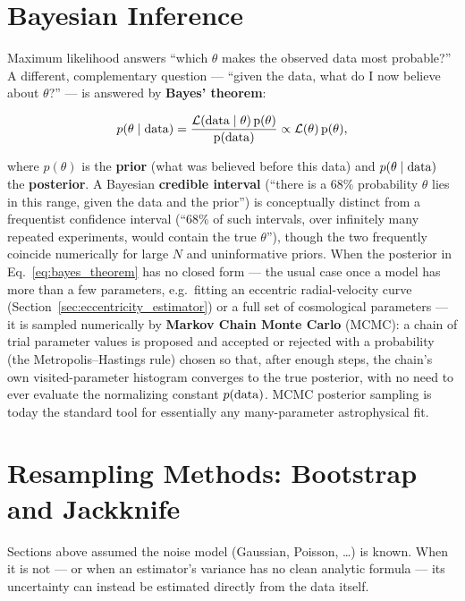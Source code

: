 \section{Bayesian Inference}

Maximum likelihood answers ``which $\theta$ makes the observed data most probable?'' A different, complementary question --- ``given the data, what do I now believe about $\theta$?'' --- is answered by \textbf{Bayes' theorem}:
\begin{keyresult}
	\begin{equation}
		p(\theta\mid \rm{data}) = \frac{\mathcal L(\rm{data}\mid\theta)\,p(\theta)}{p(\rm{data})} \propto \mathcal L(\theta)\,p(\theta),
		\label{eq:bayes_theorem}
	\end{equation}
\end{keyresult}
where $p(\theta)$ is the \textbf{prior} (what was believed before this data) and $p(\theta\mid\rm{data})$ the \textbf{posterior}. A Bayesian \textbf{credible interval} (``there is a 68\% probability $\theta$ lies in this range, given the data and the prior'') is conceptually distinct from a frequentist confidence interval (``68\% of such intervals, over infinitely many repeated experiments, would contain the true $\theta$''), though the two frequently coincide numerically for large $N$ and uninformative priors. When the posterior in Eq.~\eqref{eq:bayes_theorem} has no closed form --- the usual case once a model has more than a few parameters, e.g.\ fitting an eccentric radial-velocity curve (Section~\ref{sec:eccentricity_estimator}) or a full set of cosmological parameters --- it is sampled numerically by \textbf{Markov Chain Monte Carlo} (MCMC): a chain of trial parameter values is proposed and accepted or rejected with a probability (the Metropolis--Hastings rule) chosen so that, after enough steps, the chain's own visited-parameter histogram converges to the true posterior, with no need to ever evaluate the normalizing constant $p(\rm{data})$. MCMC posterior sampling is today the standard tool for essentially any many-parameter astrophysical fit.

\section{Resampling Methods: Bootstrap and Jackknife}

Sections above assumed the noise model (Gaussian, Poisson, \dots) is known. When it is not --- or when an estimator's variance has no clean analytic formula --- its uncertainty can instead be estimated directly from the data itself.

